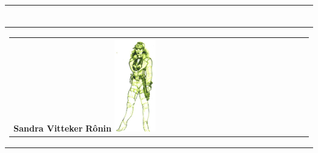 \documentclass[11pt,twoside,a4paper]{article}
\begin{document}
\begin{longtable}[ht]{ p{} }
\begin{tabular}[h]{ p{} p{} p{} }
	\end{tabular} \newline \\
	
		\hline
	\begin{tabular}[h]{ p{} p{} p{} }
		\textbf{Sandra Vitteker}										\newline
		\textbf{\small R{\^o}nin}										\newline
			\newline
		\includegraphics[width=0.15\textwidth]{img/personnageSandraVitteker.jpg}		
			\newline
			

\end{tabular}
\end{longtable}
\end{document}
